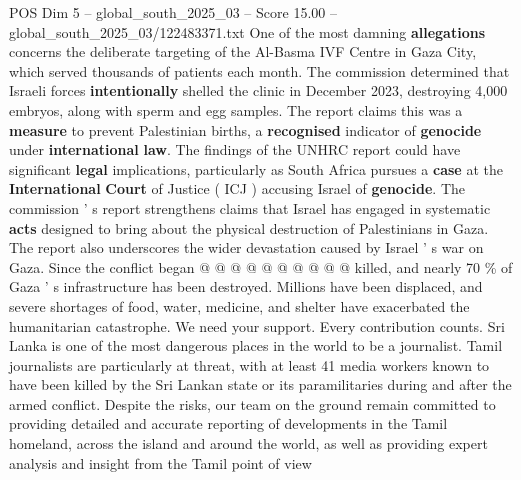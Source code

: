 \begin{textsample}{POS Dim 5 – global\_south\_2025\_03 – Score 15.00 – global\_south\_2025\_03/122483371.txt}
One of the most damning \textbf{allegations} concerns the deliberate targeting of the Al-Basma IVF Centre in Gaza City, which served thousands of patients each month.
The commission determined that Israeli forces \textbf{intentionally} shelled the clinic in December 2023, destroying 4,000 embryos, along with sperm and egg samples.
The report claims this was a \textbf{measure} to prevent Palestinian births, a \textbf{recognised} indicator of \textbf{genocide} under \textbf{international} \textbf{law}.
The findings of the UNHRC report could have significant \textbf{legal} implications, particularly as South Africa pursues a \textbf{case} at the \textbf{International} \textbf{Court} of Justice ( ICJ ) accusing Israel of \textbf{genocide}.
The commission ' s report strengthens claims that Israel has engaged in systematic \textbf{acts} designed to bring about the physical destruction of Palestinians in Gaza.
The report also underscores the wider devastation caused by Israel ' s war on Gaza.
Since the conflict began @ @ @ @ @ @ @ @ @ @ killed, and nearly 70 \% of Gaza ' s infrastructure has been destroyed.
Millions have been displaced, and severe shortages of food, water, medicine, and shelter have exacerbated the humanitarian catastrophe.
We need your support.
Every contribution counts.
Sri Lanka is one of the most dangerous places in the world to be a journalist.
Tamil journalists are particularly at threat, with at least 41 media workers known to have been killed by the Sri Lankan state or its paramilitaries during and after the armed conflict.
Despite the risks, our team on the ground remain committed to providing detailed and accurate reporting of developments in the Tamil homeland, across the island and around the world, as well as providing expert analysis and insight from the Tamil point of view

\end{textsample}
